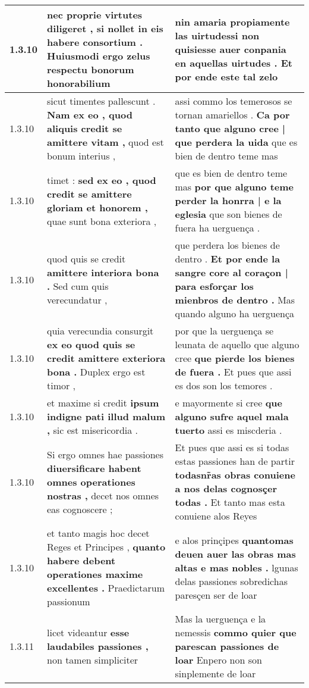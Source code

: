 \begin{tabular}{|p{1cm}|p{6.5cm}|p{6.5cm}|}
1.3.10 & nec proprie virtutes diligeret , \textbf{ si nollet in eis habere consortium . } Huiusmodi ergo zelus respectu bonorum honorabilium & nin amaria propiamente las \textbf{ uirtudessi non quisiesse auer conpania en aquellas uirtudes . } Et por ende este tal zelo \\\hline
1.3.10 & sicut timentes pallescunt . \textbf{ Nam ex eo , quod aliquis credit se amittere vitam , } quod est bonum interius , & assi commo los temerosos se tornan amariellos . \textbf{ Ca por tanto que alguno cree | que perdera la uida } que es bien de dentro teme mas \\\hline
1.3.10 & timet : \textbf{ sed ex eo , quod credit se amittere gloriam et honorem , } quae sunt bona exteriora , & que es bien de dentro teme mas \textbf{ por que alguno teme perder la honrra | e la eglesia } que son bienes de fuera ha uerguença . \\\hline
1.3.10 & quod quis se credit \textbf{ amittere interiora bona . } Sed cum quis verecundatur , & que perdera los bienes de dentro . \textbf{ Et por ende la sangre core al coraçon | para esforçar los mienbros de dentro . } Mas quando alguno ha uerguença \\\hline
1.3.10 & quia verecundia consurgit \textbf{ ex eo quod quis se credit amittere exteriora bona . } Duplex ergo est timor , & por que la uerguença se leunata de aquello que alguno cree \textbf{ que pierde los bienes de fuera . } Et pues que assi es dos son los temores . \\\hline
1.3.10 & et maxime si credit \textbf{ ipsum indigne pati illud malum , } sic est misericordia . & e mayormente si cree \textbf{ que alguno sufre aquel mala tuerto } assi es miscderia . \\\hline
1.3.10 & Si ergo omnes hae passiones \textbf{ diuersificare habent omnes operationes nostras , } decet nos omnes eas cognoscere ; & Et pues que assi es si todas estas passiones han de partir \textbf{ todasnr̃as obras conuiene a nos delas cognosçer todas . } Et tanto mas esta conuiene alos Reyes \\\hline
1.3.10 & et tanto magis hoc decet Reges et Principes , \textbf{ quanto habere debent operationes maxime excellentes . } Praedictarum passionum & e alos prinçipes \textbf{ quantomas deuen auer las obras mas altas e mas nobles . } lgunas delas passiones sobredichas paresçen ser de loar \\\hline
1.3.11 & licet videantur \textbf{ esse laudabiles passiones , } non tamen simpliciter & Mas la uerguença e la nemessis \textbf{ commo quier que parescan passiones de loar } Enpero non son sinplemente de loar \\\hline

\end{tabular}
